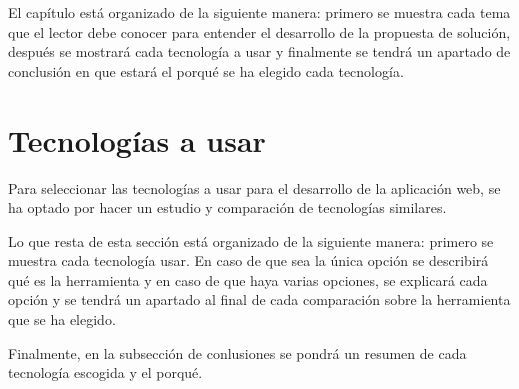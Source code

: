 El capítulo está organizado de la siguiente manera: primero se muestra cada tema que el lector debe conocer para entender el desarrollo de la propuesta de solución, después se mostrará cada tecnología a usar y finalmente se tendrá un apartado de conclusión en que estará el porqué se ha elegido cada tecnología.




 
 

 
%





\section{Tecnologías a usar}
Para seleccionar las tecnologías a usar para el desarrollo de la aplicación web, se ha optado por hacer un estudio y comparación de tecnologías similares.


Lo que resta de esta sección está organizado de la siguiente manera: primero se muestra cada tecnología usar. En caso de que sea la única opción se describirá qué es la herramienta y en caso de que haya varias opciones, se explicará cada opción y se tendrá un apartado al final de cada comparación sobre la herramienta que se ha elegido.


Finalmente, en la subsección de conlusiones se pondrá un resumen de cada tecnología escogida y el porqué.










